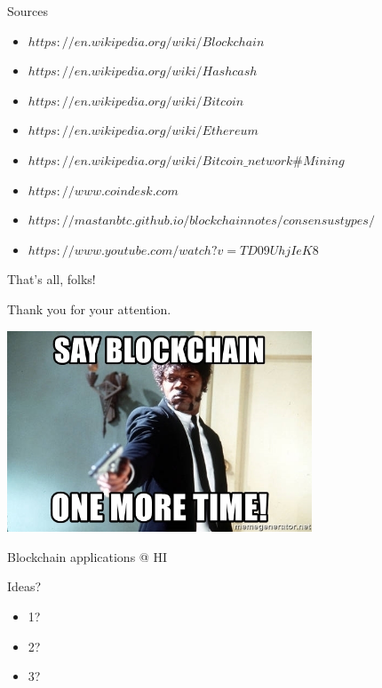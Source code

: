 \begin{frame}{Sources}
  \begin{block}{}
    \begin{itemize}
      \item $https://en.wikipedia.org/wiki/Blockchain$
      \item $https://en.wikipedia.org/wiki/Hashcash$
      \item $https://en.wikipedia.org/wiki/Bitcoin$
      \item $https://en.wikipedia.org/wiki/Ethereum$
      \item $https://en.wikipedia.org/wiki/Bitcoin\_network\#Mining$
      \item $https://www.coindesk.com$
      \item $https://mastanbtc.github.io/blockchainnotes/consensustypes/$
      \item $https://www.youtube.com/watch?v=TD09UhjIeK8$
    \end{itemize}
  \end{block}
\end{frame}

\begin{frame}{That's all, folks!}
  \begin{block}{}
    Thank you for your attention. 
  \end{block}
  \begin{block}{}
    \begin{center}
      \includegraphics[height=6cm]{img/say-blockchain.jpg}
    \end{center}
  \end{block}
\end{frame}

\begin{frame}{Blockchain applications @ HI}
  \begin{block}{Ideas?}
    \begin{itemize}
      \item 1?
      \item 2?
      \item 3?
    \end{itemize}
  \end{block}
\end{frame}

